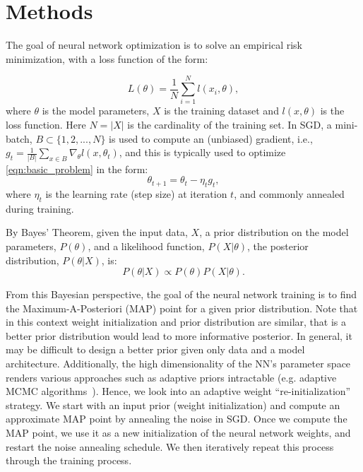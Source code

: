 \section{Methods}\label{sec:methods}
The goal of neural network optimization is to solve an empirical risk minimization, with a loss function of the form:

\begin{equation}\label{eqn:basic_problem}
L(\theta) = \frac{1}{N} \sum_{i=1}^{N} l(x_i, \theta),
\end{equation}
where $\theta$ is the model parameters, $X$ is the training
dataset and $l(x, \theta)$ is the loss function. Here $N=|X|$ is the cardinality of the training set. In SGD, a mini-batch, $B\subset\{1,2,..., N\}$ is used to compute an (unbiased) gradient,
i.e., $g_{t} = \frac{1}{|B|} \sum_{x \in B} \nabla_\theta l(x, \theta_t)$,
and this is typically used to optimize \eqref{eqn:basic_problem} in the form:
\begin{equation}\label{eqn:sgd}
\theta_{t+1} = \theta_t - \eta_t g_t,
\end{equation}
where $\eta_t$ is the learning rate (step size) at iteration $t$, and commonly annealed during training.


By Bayes' Theorem, given the input data, $X$, a prior distribution on the model 
parameters, $P(\theta)$, and a likelihood function, $P(X|\theta)$, the posterior distribution,  $P(\theta | X)$, is:
\begin{equation}
    P(\theta | X) \propto P(\theta)P(X|\theta).
\end{equation}

From this Bayesian perspective, the goal of the neural network training is to find the Maximum-A-Posteriori (MAP) point for a given prior distribution. Note that in this context weight initialization and prior distribution are similar, that is a better prior distribution would lead to more informative posterior.
In general, it may be difficult to design a better prior given only data and a model architecture. Additionally,
the high dimensionality of the NN's parameter space renders various approaches such as adaptive priors intractable (e.g. adaptive MCMC algorithms~\cite{roberts2009examples,hu2017adaptive}).
Hence, we look into an adaptive weight ``re-initialization'' strategy. We start with an input
prior (weight initialization) and compute an approximate MAP point by annealing the noise in SGD. 
Once we compute the MAP point, we use it as a new 
initialization of the neural network weights, and restart the noise annealing 
schedule. We then iteratively repeat this process through the training process.

